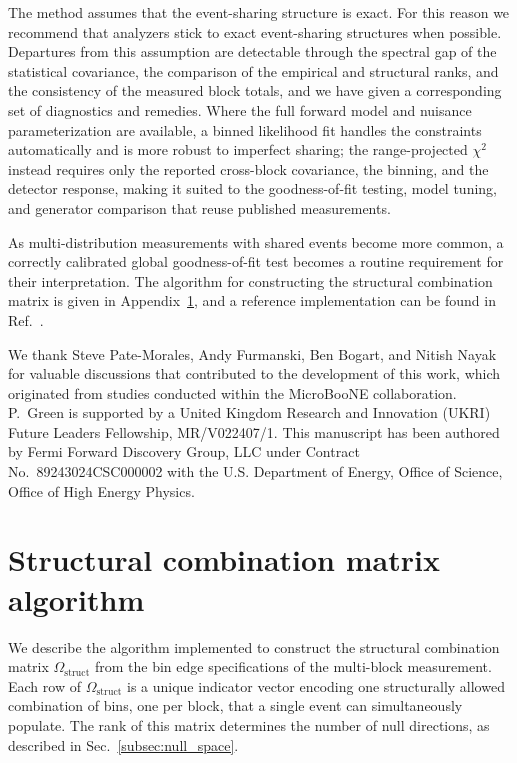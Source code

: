 \documentclass[a4paper,11pt]{article}
\begin{document}
The method assumes that the event-sharing structure is exact. For this reason we recommend that analyzers stick to exact event-sharing structures when possible. Departures from this assumption are detectable through the spectral gap of the statistical covariance, the comparison of the empirical and structural ranks, and the consistency of the measured block totals, and we have given a corresponding set of diagnostics and remedies. Where the full forward model and nuisance parameterization are available, a binned likelihood fit handles the constraints automatically and is more robust to imperfect sharing; the range-projected $\chi^{2}$ instead requires only the reported cross-block covariance, the binning, and the detector response, making it suited to the goodness-of-fit testing, model tuning, and generator comparison that reuse published measurements.

As multi-distribution measurements with shared events become more common, a correctly calibrated global goodness-of-fit test becomes a routine requirement for their interpretation. The algorithm for constructing the structural combination matrix is given in Appendix~\ref{app:algorithm}, and a reference implementation can be found in Ref.~\cite{GlobalChi2Github}.

\acknowledgments

We thank Steve Pate-Morales, Andy Furmanski, Ben Bogart, and Nitish Nayak for valuable discussions that contributed to the development of this work, which originated from studies conducted within the MicroBooNE collaboration. P.~Green is supported by a United Kingdom Research and Innovation (UKRI) Future Leaders Fellowship, MR/V022407/1. This manuscript has been authored by Fermi Forward Discovery Group, LLC under Contract No.~89243024CSC000002 with the U.S. Department of Energy, Office of Science, Office of High Energy Physics.

\appendix
\section{Structural combination matrix algorithm}
\label{app:algorithm}

We describe the algorithm implemented to construct the structural combination matrix $\Omega_{\text{struct}}$ from the bin edge specifications of the multi-block measurement. Each row of $\Omega_{\text{struct}}$ is a unique indicator vector encoding one structurally allowed combination of bins, one per block, that a single event can simultaneously populate. The rank of this matrix determines the number of null directions, as described in Sec.~\ref{subsec:null_space}.
\end{document}
